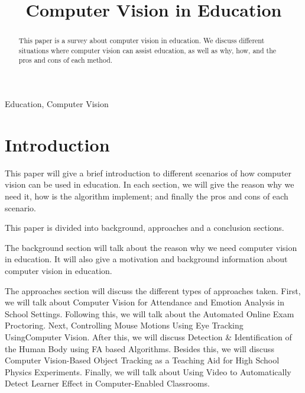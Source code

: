 \documentclass[conference]{IEEEtran}
\begin{document}
\title{Computer Vision in Education}

\author{
}

\maketitle

\begin{abstract}
    This paper is a survey about computer vision in education. We discuss different situations where 
    computer vision can assist education, as well as why, how, and the pros and cons of each method.
\end{abstract}

\begin{IEEEkeywords}
Education, Computer Vision
\end{IEEEkeywords}

\section{Introduction}

This paper will give a brief introduction to different scenarios of how computer vision can be used in education.
In each section, we will give the reason why we need it, how is the algorithm implement; and finally the pros and cons of each scenario.
 
This paper is divided into background, approaches and a conclusion sections.
 
The background section will talk about the reason why we need computer vision in education. It will also give a motivation and background information about computer vision in education.

The approaches section will discuss the different types of approaches taken. First, we will talk about Computer Vision for Attendance and Emotion Analysis in School Settings.
Following this, we will talk about the Automated Online Exam Proctoring. 
Next, Controlling Mouse Motions Using Eye Tracking UsingComputer Vision.
After this, we will discuss Detection \& Identification of the Human Body using FA based Algorithms.
Besides this, we will discuss Computer Vision-Based Object Tracking as a Teaching Aid for High School Physics Experiments.
Finally, we will talk about Using Video to Automatically Detect Learner Effect in Computer-Enabled Classrooms.
\end{document}
